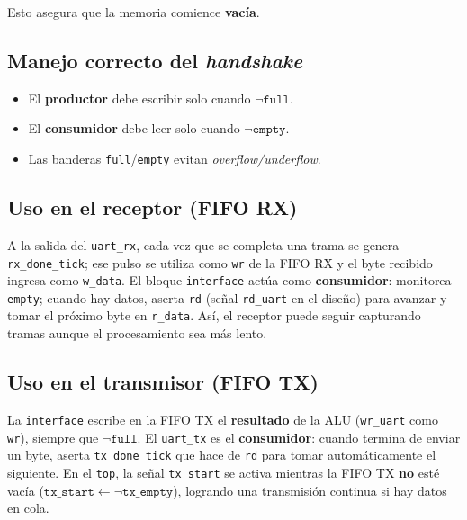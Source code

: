 Esto asegura que la memoria comience \textbf{vacía}.  

\subsection{Manejo correcto del \emph{handshake}}
\begin{itemize}
    \item El \textbf{productor} debe escribir solo cuando \(\neg\texttt{full}\).
    \item El \textbf{consumidor} debe leer solo cuando \(\neg\texttt{empty}\).
    \item Las banderas \texttt{full}/\texttt{empty} evitan \emph{overflow/underflow}.
\end{itemize}

\subsection*{Uso en el receptor (FIFO RX)}
A la salida del \texttt{uart\_rx}, cada vez que se completa una trama se genera \texttt{rx\_done\_tick}; ese pulso se utiliza como \texttt{wr} de la FIFO RX y el byte recibido ingresa como \texttt{w\_data}.  
El bloque \texttt{interface} actúa como \textbf{consumidor}: monitorea \texttt{empty}; cuando hay datos, aserta \texttt{rd} (señal \texttt{rd\_uart} en el diseño) para avanzar y tomar el próximo byte en \texttt{r\_data}. Así, el receptor puede seguir capturando tramas aunque el procesamiento sea más lento.

\subsection*{Uso en el transmisor (FIFO TX)}
La \texttt{interface} escribe en la FIFO TX el \textbf{resultado} de la ALU (\texttt{wr\_uart} como \texttt{wr}), siempre que \(\neg\texttt{full}\).  
El \texttt{uart\_tx} es el \textbf{consumidor}: cuando termina de enviar un byte, aserta \texttt{tx\_done\_tick} que hace de \texttt{rd} para tomar automáticamente el siguiente. En el \texttt{top}, la señal \texttt{tx\_start} se activa mientras la FIFO TX \textbf{no} esté vacía (\(\texttt{tx\_start} \leftarrow \neg \texttt{tx\_empty}\)), logrando una transmisión continua si hay datos en cola.
